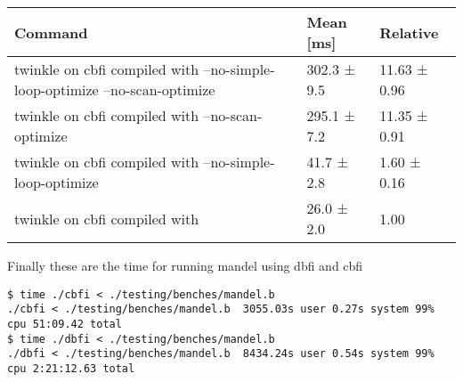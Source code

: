 \documentclass[11pt,answers]{exam}
\begin{document}
\begin{table}[H]
	\centering
	\begin{tabular}{|l|l|l|}
		\hline
		\textbf{Command}                                                           & \textbf{Mean [ms]} & \textbf{Relative} \\ \hline
		twinkle on cbfi compiled with --no-simple-loop-optimize --no-scan-optimize & 302.3 ± 9.5        & 11.63 ± 0.96      \\ \hline
		twinkle on cbfi compiled with --no-scan-optimize                           & 295.1 ± 7.2        & 11.35 ± 0.91      \\ \hline
		twinkle on cbfi compiled with --no-simple-loop-optimize                    & 41.7 ± 2.8         & 1.60 ± 0.16       \\ \hline
		twinkle on cbfi compiled with                                              & 26.0 ± 2.0         & 1.00              \\ \hline
	\end{tabular}
\end{table}

Finally these are the time for running mandel using dbfi and cbfi
\begin{verbatim}
$ time ./cbfi < ./testing/benches/mandel.b
./cbfi < ./testing/benches/mandel.b  3055.03s user 0.27s system 99% cpu 51:09.42 total	
$ time ./dbfi < ./testing/benches/mandel.b
./dbfi < ./testing/benches/mandel.b  8434.24s user 0.54s system 99% cpu 2:21:12.63 total
\end{verbatim}
\end{document}
